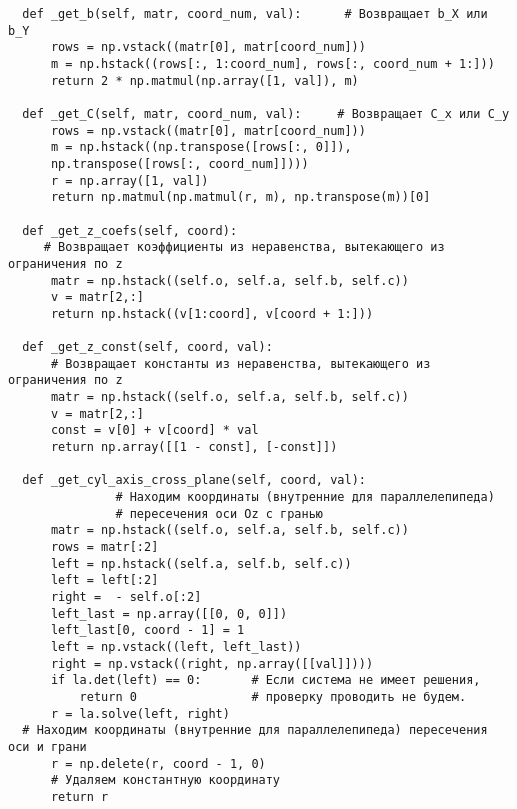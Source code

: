 \documentclass[pdftex,ptm,12pt,a4paper]{report}
\begin{document}
\begin{verbatim}
  def _get_b(self, matr, coord_num, val):      # Возвращает b_X или b_Y
      rows = np.vstack((matr[0], matr[coord_num]))
      m = np.hstack((rows[:, 1:coord_num], rows[:, coord_num + 1:]))
      return 2 * np.matmul(np.array([1, val]), m)

  def _get_C(self, matr, coord_num, val):     # Возвращает C_x или C_y
      rows = np.vstack((matr[0], matr[coord_num]))
      m = np.hstack((np.transpose([rows[:, 0]]),
      np.transpose([rows[:, coord_num]])))
      r = np.array([1, val])
      return np.matmul(np.matmul(r, m), np.transpose(m))[0]

  def _get_z_coefs(self, coord):
     # Возвращает коэффициенты из неравенства, вытекающего из ограничения по z
      matr = np.hstack((self.o, self.a, self.b, self.c))
      v = matr[2,:]
      return np.hstack((v[1:coord], v[coord + 1:]))

  def _get_z_const(self, coord, val):
      # Возвращает константы из неравенства, вытекающего из ограничения по z
      matr = np.hstack((self.o, self.a, self.b, self.c))
      v = matr[2,:]
      const = v[0] + v[coord] * val
      return np.array([[1 - const], [-const]])

  def _get_cyl_axis_cross_plane(self, coord, val):
               # Находим координаты (внутренние для параллелепипеда)
               # пересечения оси Oz с гранью
      matr = np.hstack((self.o, self.a, self.b, self.c))
      rows = matr[:2]
      left = np.hstack((self.a, self.b, self.c))
      left = left[:2]
      right =  - self.o[:2]
      left_last = np.array([[0, 0, 0]])
      left_last[0, coord - 1] = 1
      left = np.vstack((left, left_last))
      right = np.vstack((right, np.array([[val]])))
      if la.det(left) == 0:       # Если система не имеет решения,
          return 0                # проверку проводить не будем.
      r = la.solve(left, right)
  # Находим координаты (внутренние для параллелепипеда) пересечения оси и грани
      r = np.delete(r, coord - 1, 0)
      # Удаляем константную координату
      return r


\end{verbatim}
\end{document}
